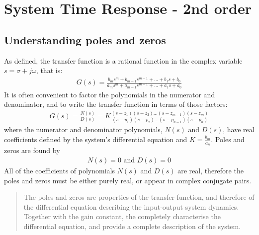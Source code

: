 \chapter{System Time Response - 2nd order}
\section{Understanding poles and zeros}
As defined, the transfer function is a rational function in the complex variable $s = \sigma + j \omega$, that is:
\begin{align}
  G(s) = \frac{b_m s^m + b_{m-1}s^{m-1} + ... + b_1 s + b_0}{a_m s^m + a_{m-1}s^{m-1} + ... + a_1 s + a_0}
\end{align}
It is often convenient to factor the polynomials in the numerator and denominator, and to write the transfer function in terms of those factors:
\begin{align}
  G(s) = \frac{N(s)}{D(s)} = K\frac{(s-z_1)(s-z_2)...(s-z_{m-1})(s-z_m)}{(s-p_1)(s-p_2)...(s-p_{n-1})(s-p_n)}
\end{align}
where the numerator and denominator polynomials, $N(s)$ and $D(s)$, have real coefficients defined by the system's differential equation and $K = \frac{b_m}{a_n}$. Poles and zeros are found by
\begin{align}
  N(s) = 0 \textrm{ and } D(s) = 0
\end{align}
All of the coefficients of polynomials $N(s)$ and $D(s)$ are real, therefore the poles and zeros must be either purely real, or appear in complex conjugate pairs.
\begin{quote}
  The poles and zeros are properties of the transfer function, and therefore of the differential equation describing the input-output system dynamics. Together with the gain constant, the completely characterise the differential equation, and provide a complete description of the system.
\end{quote}
